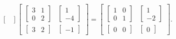 \documentclass[../MathsNotesBase.tex]{subfiles}
\begin{document}
{\begin{exe}
{\[\begin{bmatrix}
					\end{bmatrix}					
					\begin{bmatrix}
						\begin{bmatrix}
							3 & 1\\
							0 & 2
						\end{bmatrix} & 
						\begin{bmatrix}
							1  \\
							-4
						\end{bmatrix} \\[10pt]
						\begin{bmatrix}3 & 2\end{bmatrix} & \begin{bmatrix}-1\end{bmatrix}
					\end{bmatrix} =
					\begin{bmatrix}
						\begin{bmatrix}
							1 & 0\\
							0 & 1
						\end{bmatrix} & 
						\begin{bmatrix}
							1  \\
							-2
						\end{bmatrix} \\[10pt]
						\begin{bmatrix}0 & 0\end{bmatrix} & \begin{bmatrix}0\end{bmatrix}
					\end{bmatrix}.
				\]
		
}
\end{exe}}
\end{document}
